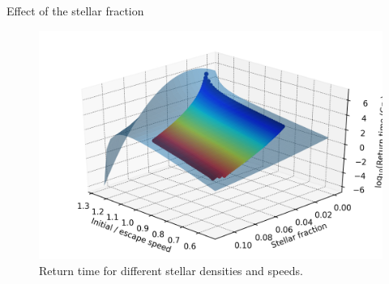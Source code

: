\documentclass{beamer}
\begin{document}
\begin{frame}{Effect of the stellar fraction}
	\begin{figure}[h]
		\centering
		\includegraphics[width=0.8\linewidth]{"../Files/Week 10/surface"}
		\caption{Return time for different stellar densities and speeds.}
	\end{figure}
\end{frame}
\end{document}

